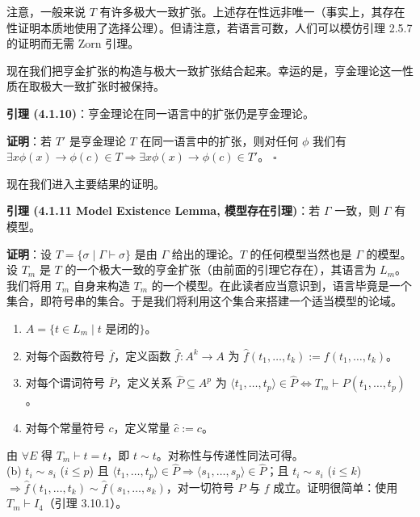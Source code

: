 \documentclass[12pt, a4paper]{article}
\begin{document}
注意，一般来说 \(T\) 有许多极大一致扩张。上述存在性远非唯一（事实上，其存在性证明本质地使用了选择公理）。但请注意，若语言可数，人们可以模仿引理 2.5.7 的证明而无需 Zorn 引理。

现在我们把亨金扩张的构造与极大一致扩张结合起来。幸运的是，亨金理论这一性质在取极大一致扩张时被保持。

\begin{mdframed}
\textbf{引理 (4.1.10)}：亨金理论在同一语言中的扩张仍是亨金理论。
\end{mdframed}

\textbf{证明}：若 \(T'\) 是亨金理论 \(T\) 在同一语言中的扩张，则对任何 \(\phi\) 我们有 \(\exists x \phi(x) \to \phi(c) \in T \Rightarrow \exists x \phi(x) \to \phi(c) \in T'\)。 \hfill \(\square\)

现在我们进入主要结果的证明。

\begin{mdframed}
\textbf{引理 (4.1.11 Model Existence Lemma, 模型存在引理)}：若 \(\Gamma\) 一致，则 \(\Gamma\) 有模型。
\end{mdframed}

\textbf{证明}：设 \(T = \{\sigma \mid \Gamma \vdash \sigma\}\) 是由 \(\Gamma\) 给出的理论。\(T\) 的任何模型当然也是 \(\Gamma\) 的模型。\\
设 \(T_m\) 是 \(T\) 的一个极大一致的亨金扩张（由前面的引理它存在），其语言为 \(L_m\)。我们将用 \(T_m\) 自身来构造 \(T_m\) 的一个模型。在此读者应当意识到，语言毕竟是一个集合，即符号串的集合。于是我们将利用这个集合来搭建一个适当模型的论域。
\begin{enumerate}
    \item \(A = \{t \in L_m \mid t \text{ 是闭的} \}\)。
    \item 对每个函数符号 \(\overline{f}\)，定义函数 \(\hat{f}: A^k \to A\) 为 \(\hat{f}(t_1, \dots, t_k) := f(t_1, \dots, t_k)\)。
    \item 对每个谓词符号 \(\overline{P}\)，定义关系 \(\hat{P} \subseteq A^p\) 为 \(\langle t_1, \dots, t_p \rangle \in \hat{P} \iff T_m \vdash P(t_1, \dots, t_p)\)。
    \item 对每个常量符号 \(c\)，定义常量 \(\hat{c} := c\)。
\end{enumerate}

由 \(\forall E\) 得 \(T_m \vdash t = t\)，即 \(t \sim t\)。对称性与传递性同法可得。\\
(b) \(t_i \sim s_i\) (\(i \leq p\)) 且 \(\langle t_1, \dots, t_p \rangle \in \hat{P} \Rightarrow \langle s_1, \dots, s_p \rangle \in \hat{P}\)；且 \(t_i \sim s_i\) (\(i \leq k\)) \(\Rightarrow \hat{f}(t_1, \dots, t_k) \sim \hat{f}(s_1, \dots, s_k)\)，对一切符号 \(P\) 与 \(f\) 成立。证明很简单：使用 \(T_m \vdash I_4\)（引理 3.10.1）。
\end{document}

